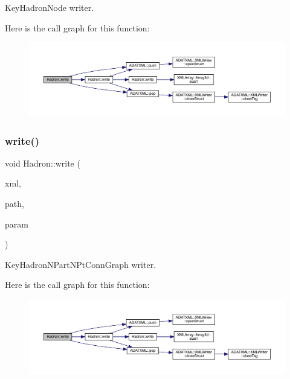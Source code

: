 Key\+Hadron\+Node writer. 

Here is the call graph for this function\+:\nopagebreak
\begin{figure}[H]
\begin{center}
\leavevmode
\includegraphics[width=350pt]{d1/daf/namespaceHadron_aa7f9575393c93afa7db5f164da5c31eb_cgraph}
\end{center}
\end{figure}
\mbox{\label{namespaceHadron_a25da56def6a3cbbe579c9b7b4d27e848}} 
\subsubsection{\texorpdfstring{write()}{write()}\hspace{0.1cm}{\footnotesize\ttfamily [67/95]}}
{\footnotesize\ttfamily void Hadron\+::write (\begin{DoxyParamCaption}\item[{\mbox{\hyperlink{classADATXML_1_1XMLWriter}{X\+M\+L\+Writer}} \&}]{xml,  }\item[{const std\+::string \&}]{path,  }\item[{const \mbox{\hyperlink{structHadron_1_1KeyHadronNPartNPtConnGraph__t}{Key\+Hadron\+N\+Part\+N\+Pt\+Conn\+Graph\+\_\+t}} \&}]{param }\end{DoxyParamCaption})}



Key\+Hadron\+N\+Part\+N\+Pt\+Conn\+Graph writer. 

Here is the call graph for this function\+:\nopagebreak
\begin{figure}[H]
\begin{center}
\leavevmode
\includegraphics[width=350pt]{d1/daf/namespaceHadron_a25da56def6a3cbbe579c9b7b4d27e848_cgraph}
\end{center}
\end{figure}
\mbox{\label{namespaceHadron_a4e777dd6c1ccf60b80a383fd5901627b}} 

